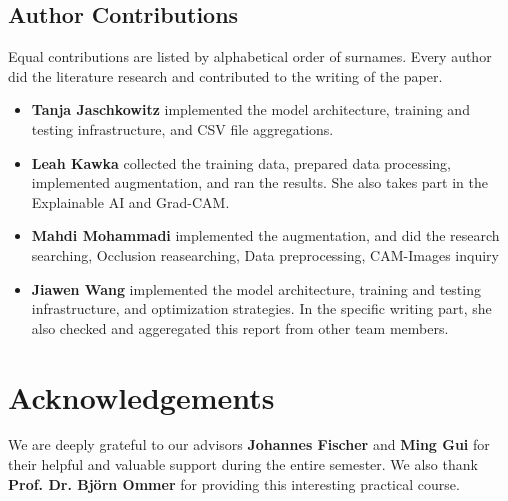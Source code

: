 \subsection*{Author Contributions}
\label{sec:author}
Equal contributions are listed by alphabetical order of surnames. 
Every author did the literature research and contributed to the writing of the paper. 

\begin{itemize}
  \item \textbf{Tanja Jaschkowitz} implemented the model architecture, training and testing infrastructure, and CSV file aggregations. 
  \item \textbf{Leah Kawka} collected the training data, prepared data processing, implemented augmentation, and ran the results. 
  She also takes part in the Explainable AI and Grad-CAM.
  \item \textbf{Mahdi Mohammadi} implemented the augmentation, and did the research searching, Occlusion reasearching, Data preprocessing, CAM-Images inquiry
  \item \textbf{Jiawen Wang} implemented the model architecture, training and testing infrastructure, and optimization strategies. 
  In the specific writing part, she also checked and aggeregated this report from other team members.
\end{itemize}

\section*{Acknowledgements}

We are deeply grateful to our advisors \textbf{Johannes Fischer} and \textbf{Ming Gui} for their helpful and valuable support during the entire semester. 
We also thank \textbf{Prof. Dr. Björn Ommer} for providing this interesting practical course.
